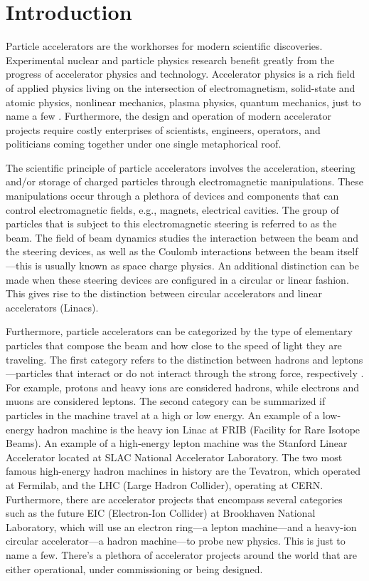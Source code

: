\chapter{Introduction}
\label{sec:ch1}
 
Particle accelerators are the workhorses for modern scientific discoveries. Experimental nuclear and particle physics research benefit greatly from the progress of accelerator physics and technology. Accelerator physics is a rich field of applied physics living on the intersection of electromagnetism, solid-state and atomic physics, nonlinear mechanics, plasma physics, quantum mechanics, just to name a few \cite{sylee}. Furthermore, the design and operation of modern accelerator projects require costly enterprises of scientists, engineers, operators, and politicians coming together under one single metaphorical roof.         

The scientific principle of particle accelerators involves the acceleration, steering and/or storage of charged particles through electromagnetic manipulations. These manipulations occur through a plethora of devices and components that can control electromagnetic fields, e.g., magnets, electrical cavities. The group of particles that is subject to this electromagnetic steering is referred to as the beam. The field of beam dynamics studies the interaction between the beam and the steering devices, as well as the Coulomb interactions between the beam itself---this is usually known as space charge physics. An additional distinction can be made when these steering devices are configured in a circular or linear fashion. This gives rise to the distinction between circular accelerators and linear accelerators (Linacs).

Furthermore, particle accelerators can be categorized by the type of elementary particles that compose the beam and how close to the speed of light they are traveling. The first category refers to the distinction between hadrons and leptons---particles that interact or do not interact through the strong force, respectively \cite{griffiths}. For example, protons and heavy ions are considered hadrons, while electrons and muons are considered leptons. The second category can be summarized if particles in the machine travel at a high or low energy. An example of a low-energy hadron machine is the heavy ion Linac at FRIB (Facility for Rare Isotope Beams). An example of a high-energy lepton machine was the Stanford Linear Accelerator located at SLAC National Accelerator Laboratory. The two most famous high-energy hadron machines in history are the Tevatron, which operated at Fermilab, and the LHC (Large Hadron Collider), operating at CERN. Furthermore, there are accelerator projects that encompass several categories such as the future EIC (Electron-Ion Collider) at Brookhaven National Laboratory, which will use an electron ring---a lepton machine---and a heavy-ion circular accelerator---a hadron machine---to probe new physics. This is just to name a few. There's a plethora of accelerator projects around the world that are either operational, under commissioning or being designed. 


